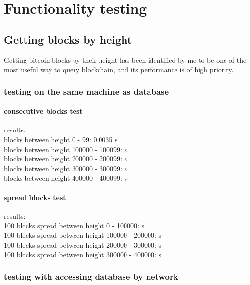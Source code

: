 \documentclass[12pt, en, eng, oneside]{mgr}
\begin{document}
\chapter{Functionality testing}

\section{Getting blocks by height}
Getting bitcoin blocks by their height has been identified by me to be one of the most useful way to query blockchain, and its performance is of high priority.
 
\subsection{testing on the same machine as database} 

\subsubsection{consecutive blocks test}
results:
\\
blocks between height 0 - 99: \quad \quad \quad \hspace*{2em} 0.0035 s\\
blocks between height 100000 - 100099:  s\\
blocks between height 200000 - 200099:  s\\
blocks between height 300000 - 300099:  s\\
blocks between height 400000 - 400099:  s\\

\subsubsection{spread blocks test}
results:
\\
100 blocks spread between height 0 - 100000: \quad \quad {} s\\
100 blocks spread between height 100000 - 200000:  s\\
100 blocks spread between height 200000 - 300000:  s\\
100 blocks spread between height 300000 - 400000:  s\\

\subsection{testing with accessing database by network}
\end{document}
